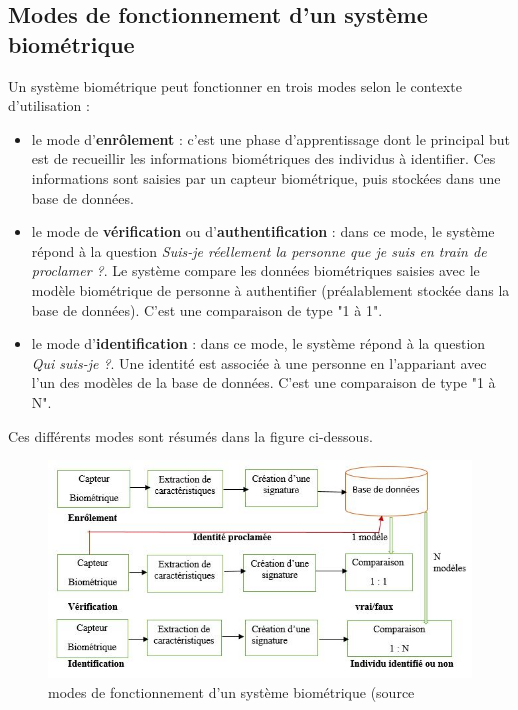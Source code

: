 \subsection{Modes de fonctionnement d'un système biométrique}

Un système biométrique peut fonctionner en trois modes selon le contexte d'utilisation :
\begin{itemize}
	\item [\textbullet] le mode d'\textbf{enrôlement} : c'est une phase d'apprentissage dont le principal but est de recueillir les informations biométriques des individus à identifier. Ces informations sont saisies par un capteur biométrique, puis stockées dans une base de données.
	
	\item [\textbullet] le mode de \textbf{vérification} ou d'\textbf{authentification} : dans ce mode, le système répond à la question \og \textit{Suis-je réellement la personne que je suis en train de proclamer ?}\fg{}\citep{Sou12}. Le système compare les données biométriques saisies avec le modèle biométrique de personne à authentifier (préalablement stockée dans la base de données). C'est une comparaison de type "1 à 1".
	
	\item [\textbullet] le mode d'\textbf{identification} : dans ce mode, le système répond à la question \og \textit{Qui suis-je ?}\fg{}. Une identité est associée à une personne en l'appariant avec l'un des modèles de la base de données. C'est une comparaison de type "1 à N".
\end{itemize}
 Ces différents modes sont résumés dans la figure ci-dessous.
\begin{figure}[htbp]
	\centering
		\includegraphics{mode.JPG}
	\caption[modes de fonctionnement d'un système biométrique]{modes de fonctionnement d'un système biométrique (source \cite{Sou12}}
	\label{fig:mode}
\end{figure}

